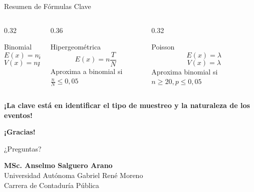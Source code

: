 \documentclass[10pt]{beamer}
\begin{document}
\begin{frame}{Resumen de Fórmulas Clave}
\begin{columns}[T]
\begin{column}{0.32\textwidth}
\begin{exampleblock}{Binomial}
\[
E(x) = np
\]
\[
V(x) = npq
\]
\end{exampleblock}
\end{column}
\begin{column}{0.36\textwidth}
\begin{alertblock}{Hipergeométrica}
\[
E(x) = n\frac{T}{N}
\]
Aproxima a binomial si $\frac{n}{N} \leq 0,05$
\end{alertblock}
\end{column}
\begin{column}{0.32\textwidth}
\begin{block}{Poisson}
\[
E(x) = \lambda
\]
\[
V(x) = \lambda
\]
Aproxima binomial si $n\geq20, p\leq0,05$
\end{block}
\end{column}
\end{columns}

\vspace{0.5cm}
\begin{center}
\Large
\textcolor{celesteoscuro}{\textbf{¡La clave está en identificar el tipo de muestreo y la naturaleza de los eventos!}}
\end{center}
\end{frame}

\begin{frame}{}
\centering
\vspace{2cm}
{\Huge \textcolor{celesteoscuro}{\textbf{¡Gracias!}}}

\vspace{0.5cm}
{\large ¿Preguntas?}

\vspace{1cm}
\footnotesize
\textcolor{celesteoscuro}{\textbf{MSc. Anselmo Salguero Arano}}\\
Universidad Autónoma Gabriel René Moreno\\
Carrera de Contaduría Pública
\end{frame}
\end{document}
